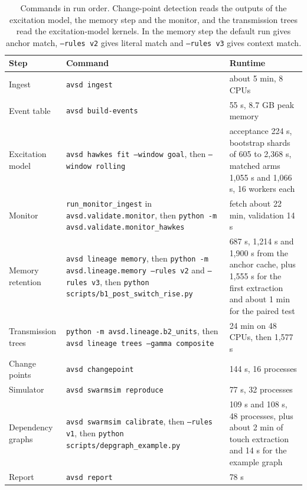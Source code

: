 \documentclass{arxivtmpl}
\begin{document}
\begin{table}[htbp]
\centering
\small
\caption{Commands in run order. Change-point detection reads the outputs of the excitation model, the memory step and the monitor, and the transmission trees read the excitation-model kernels. In the memory step the default run gives anchor match, \texttt{--rules v2} gives literal match and \texttt{--rules v3} gives context match.}
\begin{tabularx}{\linewidth}{lLL}
\toprule
Step & Command & Runtime \\
\midrule
Ingest & \texttt{avsd ingest} & about 5 min, 8 CPUs \\
Event table & \texttt{avsd build-\allowbreak{}events} & 55 s, 8.7 GB peak memory \\
Excitation model & \texttt{avsd hawkes fit --window goal}, then \texttt{--window rolling} & acceptance 224 s, bootstrap shards of 605 to 2,368 s, matched arms 1,055 s and 1,066 s, 16 workers each \\
Monitor & \texttt{run\_\allowbreak{}monitor\_\allowbreak{}ingest} in \texttt{avsd.\allowbreak{}validate.\allowbreak{}monitor}, then \texttt{python -m avsd.\allowbreak{}validate.\allowbreak{}monitor\_\allowbreak{}hawkes} & fetch about 22 min, validation 14 s \\
Memory retention & \texttt{avsd lineage memory}, then \texttt{python -m avsd.\allowbreak{}lineage.\allowbreak{}memory --rules v2} and \texttt{--rules v3}, then \texttt{python scripts/\allowbreak{}b1\_\allowbreak{}post\_\allowbreak{}switch\_\allowbreak{}rise.\allowbreak{}py} & 687 s, 1,214 s and 1,900 s from the anchor cache, plus 1,555 s for the first extraction and about 1 min for the paired test \\
Transmission trees & \texttt{python -m avsd.\allowbreak{}lineage.\allowbreak{}b2\_\allowbreak{}units}, then \texttt{avsd lineage trees --gamma composite} & 24 min on 48 CPUs, then 1,577 s \\
Change points & \texttt{avsd changepoint} & 144 s, 16 processes \\
Simulator & \texttt{avsd swarmsim reproduce} & 77 s, 32 processes \\
Dependency graphs & \texttt{avsd swarmsim calibrate}, then \texttt{--rules v1}, then \texttt{python scripts/\allowbreak{}depgraph\_\allowbreak{}example.\allowbreak{}py} & 109 s and 108 s, 48 processes, plus about 2 min of touch extraction and 14 s for the example graph \\
Report & \texttt{avsd report} & 78 s \\
\bottomrule
\end{tabularx}
\end{table}
\end{document}
